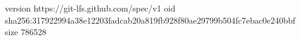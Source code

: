version https://git-lfs.github.com/spec/v1
oid sha256:317922994a38e12203fadcab20a819fb928f80ae29799b504fc7ebac0e240bbf
size 786528
